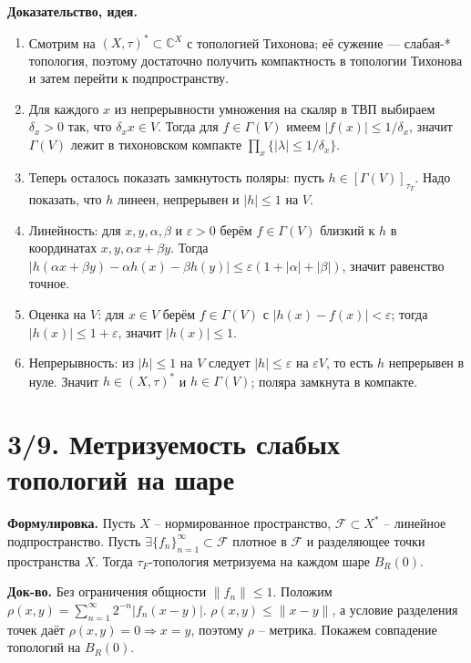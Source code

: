 \documentclass[10pt,a4paper]{article}
\newcommand{\X}{X}
\newcommand{\CC}{\mathbb C}
\begin{document}
	\textbf{Доказательство, идея.}
	\begin{enumerate}
		\item Смотрим на $(\X,\tau)^\ast\subset\CC^\X$ с топологией Тихонова; её сужение --- слабая-* топология, поэтому достаточно получить компактность в топологии Тихонова и затем перейти к подпространству.
		\item Для каждого $x$ из непрерывности умножения на скаляр в ТВП выбираем $\delta_x>0$ так, что $\delta_xx\in V$. Тогда для $f\in\Gamma(V)$ имеем $|f(x)|\le1/\delta_x$, значит $\Gamma(V)$ лежит в тихоновском компакте $\prod_x\{|\lambda|\le1/\delta_x\}$.
		\item Теперь осталось показать замкнутость поляры: пусть $h\in[\Gamma(V)]_{\tau_T}$. Надо показать, что $h$ линеен, непрерывен и $|h|\le1$ на $V$.
		\item Линейность: для $x,y,\alpha,\beta$ и $\varepsilon>0$ берём $f\in\Gamma(V)$ близкий к $h$ в координатах $x,y,\alpha x+\beta y$. Тогда $|h(\alpha x+\beta y)-\alpha h(x)-\beta h(y)|\le\varepsilon(1+|\alpha|+|\beta|)$, значит равенство точное.
		\item Оценка на $V$: для $x\in V$ берём $f\in\Gamma(V)$ с $|h(x)-f(x)|<\varepsilon$; тогда $|h(x)|\le1+\varepsilon$, значит $|h(x)|\le1$.
		\item Непрерывность: из $|h|\le1$ на $V$ следует $|h|\le\varepsilon$ на $\varepsilon V$, то есть $h$ непрерывен в нуле. Значит $h\in(\X,\tau)^\ast$ и $h\in\Gamma(V)$; поляра замкнута в компакте.
	\end{enumerate}

	\section*{3/9. Метризуемость слабых топологий на шаре}
	\textbf{Формулировка.}
	Пусть $X$ -- нормированное пространство,
	$\mathcal F\subset X^*$ -- линейное подпространство.
	Пусть
	$\exists \{f_n\}_{n=1}^\infty\subset\mathcal F$ плотное в $\mathcal F$ и
	разделяющее точки пространства $X$.
	Тогда $\tau_F$-топология метризуема
	на каждом шаре $B_R(0)$.

	\textbf{Док-во.}
	Без ограничения общности $\|f_n\|\le1$.
	Положим
	$\rho(x,y)=\sum_{n=1}^{\infty}2^{-n}|f_n(x-y)|$.
	$\rho(x,y)\le\|x-y\|$, а
	условие разделения точек даёт
	$\rho(x,y)=0\Rightarrow x=y$,
	поэтому $\rho$ -- метрика.
	Покажем совпадение топологий на $B_R(0)$.
\end{document}
